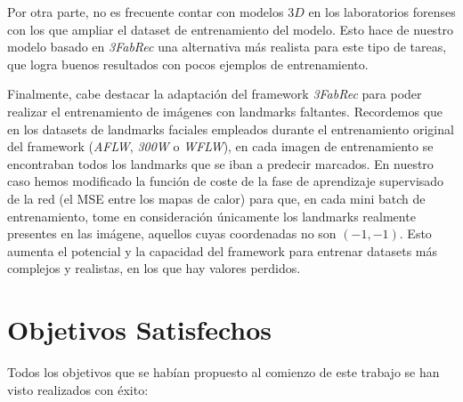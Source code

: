 \noindent Por otra parte, no es frecuente contar con modelos $3D$ en los laboratorios forenses con los que ampliar el dataset de entrenamiento del modelo. Esto hace de nuestro modelo basado en \textit{3FabRec} una alternativa más realista para este tipo de tareas, que logra buenos resultados con pocos ejemplos de entrenamiento.

\medskip

\noindent Finalmente, cabe destacar la adaptación del framework \textit{3FabRec} para poder realizar el entrenamiento de imágenes con landmarks faltantes. Recordemos que en los datasets de landmarks faciales empleados durante el entrenamiento original del framework (\textit{AFLW}, \textit{300W} o \textit{WFLW}), en cada imagen de entrenamiento se encontraban todos los landmarks que se iban a predecir marcados. En nuestro caso hemos modificado la función de coste de la fase de aprendizaje supervisado de la red (el MSE entre los mapas de calor) para que, en cada mini batch de entrenamiento, tome en consideración únicamente los landmarks realmente presentes en las imágene, aquellos cuyas coordenadas no son $(-1,-1)$. Esto aumenta el potencial y la capacidad del framework para entrenar datasets más complejos y realistas, en los que hay valores perdidos.

\section{Objetivos Satisfechos}

Todos los objetivos que se habían propuesto al comienzo de este trabajo se han visto realizados con éxito:

